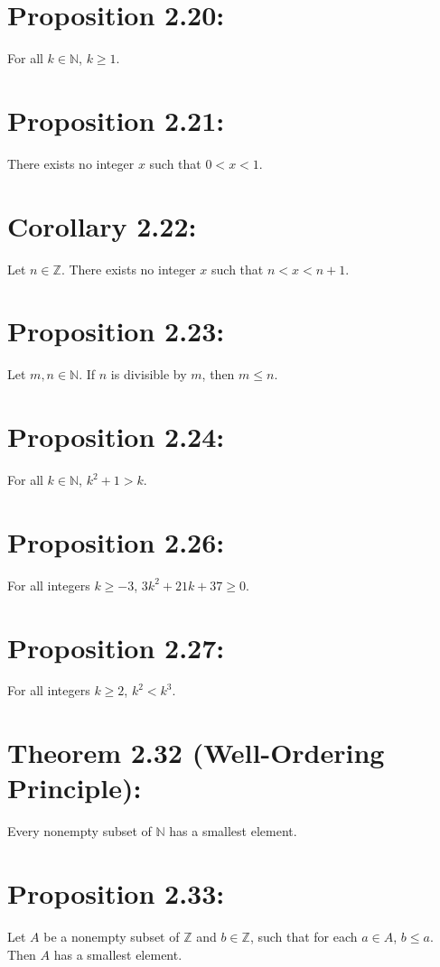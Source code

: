 \section*{Proposition 2.20:}
For all $k \in \mathbb{N}$, $k \geq 1$.

\section*{Proposition 2.21:}
There exists no integer $x$ such that $0 < x < 1$.

\section*{Corollary 2.22:}
Let $n \in \mathbb{Z}$. There exists no integer $x$ such that $n < x < n+1$.

\section*{Proposition 2.23:}
Let $m,n \in \mathbb{N}$. If $n$ is divisible by $m$, then $m \leq n$.

\section*{Proposition 2.24:}
For all $k \in \mathbb{N}$, $k^2 + 1 > k$.

\section*{Proposition 2.26:}
For all integers $k \geq -3$, $3k^2 + 21k + 37 \geq 0$.

\section*{Proposition 2.27:}
For all integers $k \geq 2$, $k^2 < k^3$.

\section*{Theorem 2.32 (Well-Ordering Principle):}
Every nonempty subset of $\mathbb{N}$ has a smallest element.

\section*{Proposition 2.33:}
Let $A$ be a nonempty subset of $\mathbb{Z}$ and $b \in \mathbb{Z}$, such that for each $a \in A$, $b \leq a$. Then $A$ has a smallest element.

